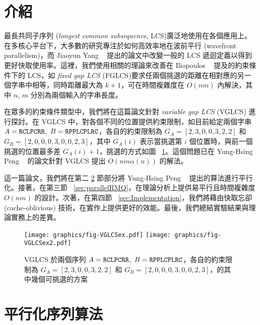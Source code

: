 \documentclass{gapd}
\begin{document}
\maketitle

\section{介紹} %
\label{sec:Introduction}

最長共同子序列 (\emph{longest common subsequence}, LCS)廣泛地使用在各個應用上。在多核心平台下，大多數的研究專注於如何高效率地在波前平行 (wavefront parallelism)，而 Jiaoyun Yang ~\cite{jiaoyun} 提出的論文中改變一般的 LCS 遞迴定義以得到更好快取使用率。這裡，我們使用相關的理論來改善在 Iliopoulos ~\cite{iliopoulos} 提及的約束條件下的 LCS，如 \emph{fixed gap LCS } (FGLCS)要求任兩個挑選的距離在相對應的另一個字串中相等，同時距離最大為 $k+1$，可在時間複雜度在 $O(nm)$ 內解決，其中 $n$, $m$ 分別為兩個輸入的字串長度。

在眾多的約束條件類型中，我們將在這篇論文針對 \emph{variable gap LCS} (VGLCS) 進行探討。在 VGLCS 中，對各個不同的位置提供約束限制，如目前給定兩個字串 $A = \tt{RCLPCRR}$, $B = \tt{RPPLCPLRC}$，各自的約束限制為 $G_A = [2, 3, 0, 0, 3, 2, 2]$ 和 $G_B = [2, 0, 0, 0, 3, 0, 0, 2, 3]$，其中 $G_A(i)$ 表示當挑選第 $i$ 個位置時，與前一個挑選的位置最多差 $G_A(i)+1$，挑選的方式如圖 ~\ref{fig:VGLCSex}。這個問題已在 Yung-Hsing Peng ~\cite{yunghsing} 的論文針對 VGLCS 提出 $O(nm \alpha(n))$ 的解法。

這一篇論文，我們將在第二 \ref{sec:parallelSerial} 節部分將 Yung-Hsing Peng ~\cite{yunghsing} 提出的算法進行平行化。接著，在第三節 ~\ref{sec:parallelRMQ}，在理論分析上提供易平行且時間複雜度 $O(nm)$ 的設計。次著，在第四節 ~\ref{sec:Implementation}，我們將藉由快取忘卻 (cache-oblivious) 技術，在實作上提供更好的效能。最後，我們總結實驗結果與理論實務上的差異。

\begin{figure}[!thb]
  \centering
  \texttt{[image: graphics/fig-VGLCSex.pdf]}
  \texttt{[image: graphics/fig-VGLCSex2.pdf]}
  \caption{VGLCS 於兩個序列 $A = \tt{RCLPCRR}$, $B = \tt{RPPLCPLRC}$，各自的約束限制為 $G_A = [2, 3, 0, 0, 3, 2, 2]$ 和 $G_B = [2, 0, 0, 0, 3, 0, 0, 2, 3]$，的其中幾個可挑選的方案}
  \label{fig:VGLCSex}
\end{figure}

\section{平行化序列算法} %
\label{sec:parallelSerial}
\end{document}

